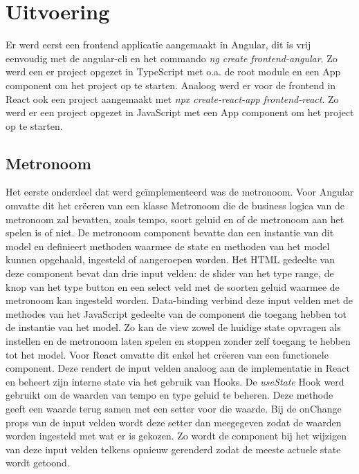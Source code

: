 \section{Uitvoering}
 Er werd eerst een frontend applicatie aangemaakt in Angular, dit is vrij eenvoudig met de angular-cli en het commando \textit{ng create frontend-angular}. Zo werd een er project opgezet in TypeScript met o.a. de root module en een App component om het project op te starten. Analoog werd er voor de frontend in React ook een project aangemaakt met \textit{npx create-react-app frontend-react}. Zo werd er een project opgezet in JavaScript met een App component om het project op te starten. 

 \subsection{Metronoom}
 Het eerste onderdeel dat werd geïmplementeerd was de metronoom. Voor Angular omvatte dit het crëeren van een klasse Metronoom die de business logica van de metronoom zal bevatten, zoals tempo, soort geluid en of de metronoom aan het spelen is of niet. De metronoom component bevatte dan een instantie van dit model en definieert methoden waarmee de state en methoden van het model kunnen opgehaald, ingesteld of aangeroepen worden. Het HTML gedeelte van deze component bevat dan drie input velden: de slider van het type range, de knop van het type button en een select veld met de soorten geluid waarmee de metronoom kan ingesteld worden. Data-binding verbind deze input velden met de methodes van het JavaScript gedeelte van de component die toegang hebben tot de instantie van het model. Zo kan de view zowel de huidige state opvragen als instellen en de metronoom laten spelen en stoppen zonder zelf toegang te hebben tot het model.
 Voor React omvatte dit enkel het crëeren van een functionele component. Deze rendert de input velden analoog aan de implementatie in React en beheert zijn interne state via het gebruik van Hooks. De \textit{useState} Hook werd gebruikt om de waarden van tempo en type geluid te beheren. Deze methode geeft een waarde terug samen met een setter voor die waarde. Bij de onChange props van de input velden wordt deze setter dan meegegeven zodat de waarden worden ingesteld met wat er is gekozen. Zo wordt de component bij het wijzigen van deze input velden telkens opnieuw gerenderd zodat de meeste actuele state wordt getoond.


